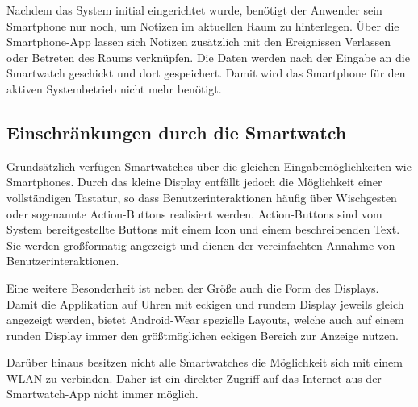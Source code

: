 Nachdem das System initial eingerichtet wurde, benötigt der Anwender sein Smartphone nur noch, um Notizen im aktuellen Raum zu hinterlegen. Über die Smartphone-App lassen sich Notizen zusätzlich mit den Ereignissen Verlassen oder Betreten des Raums verknüpfen. Die Daten werden nach der Eingabe an die Smartwatch geschickt und dort gespeichert. Damit wird das Smartphone für den aktiven Systembetrieb nicht mehr benötigt.

\subsection{Einschränkungen durch die Smartwatch}
\label{sec:einschraenkungen}
Grundsätzlich verfügen Smartwatches über die gleichen Eingabemöglichkeiten wie Smartphones. Durch das kleine Display entfällt jedoch die Möglichkeit einer vollständigen Tastatur, so dass Benutzerinteraktionen häufig über Wischgesten oder sogenannte Action-Buttons realisiert werden. Action-Buttons sind vom System bereitgestellte Buttons mit einem Icon und einem beschreibenden Text. Sie werden großformatig angezeigt und dienen der vereinfachten Annahme von Benutzerinteraktionen.

Eine weitere Besonderheit ist neben der Größe auch die Form des Displays. Damit die Applikation auf Uhren mit eckigen und rundem Display jeweils gleich angezeigt werden, bietet Android-Wear spezielle Layouts, welche auch auf einem runden Display immer den größtmöglichen eckigen Bereich zur Anzeige nutzen.

Darüber hinaus besitzen nicht alle Smartwatches die Möglichkeit sich mit einem WLAN zu verbinden. Daher ist ein direkter Zugriff auf das Internet aus der Smartwatch-App nicht immer möglich.
